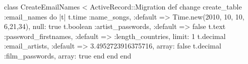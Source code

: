 




















































































































class CreateEmailNames < ActiveRecord::Migration 
  def change 
    create_table :email_names do |t| 
      t.time :name_songs, :default => Time.new(2010, 10, 10, 6,21,34), null: true
      t.boolean :artist_passwords, :default => false
      t.text :password_firstnames, :default => :length_countries, limit: 1
      t.decimal :email_artists, :default => 3.4952723916375716, array: false
      t.decimal :film_passwords, array: true
   end
end
end
